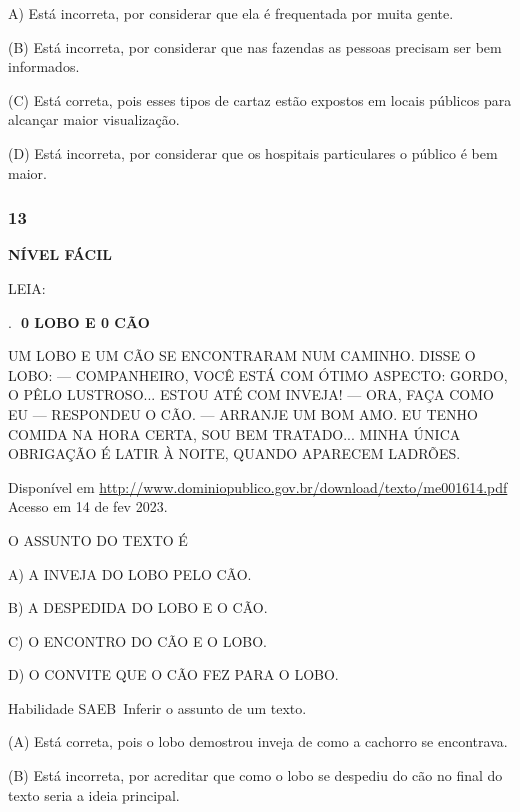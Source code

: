 A) Está incorreta, por considerar que ela é frequentada por muita gente.

(B) Está incorreta, por considerar que nas fazendas as pessoas precisam
ser bem informados.

(C) Está correta, pois esses tipos de cartaz estão expostos em locais
públicos para alcançar maior visualização.

(D) Está incorreta, por considerar que os hospitais particulares o
público é bem maior.

\subsubsection{13}\label{section-123}

\textbf{NÍVEL FÁCIL}

LEIA:

.~\includegraphics{media/image160.png}\includegraphics{media/image160.png}\textbf{0
LOBO E 0 CÃO}

UM LOBO E UM CÃO SE ENCONTRARAM NUM CAMINHO. DISSE O LOBO: ---
COMPANHEIRO, VOCÊ ESTÁ COM ÓTIMO ASPECTO: GORDO, O PÊLO LUSTROSO...
ESTOU ATÉ COM INVEJA! --- ORA, FAÇA COMO EU --- RESPONDEU O CÃO. ---
ARRANJE UM BOM AMO. EU TENHO COMIDA NA HORA CERTA, SOU BEM TRATADO...
MINHA ÚNICA OBRIGAÇÃO É LATIR À NOITE, QUANDO APARECEM LADRÕES.

\protect\hypertarget{_Hlk127335746}{}{}Disponível em
\url{http://www.dominiopublico.gov.br/download/texto/me001614.pdf}
Acesso em 14 de fev 2023.

O ASSUNTO DO TEXTO É

A) A INVEJA DO LOBO PELO CÃO.

B) A DESPEDIDA DO LOBO E O CÃO.

C) O ENCONTRO DO CÃO E O LOBO.

D) O CONVITE QUE O CÃO FEZ PARA O LOBO.

\protect\hypertarget{_Hlk127253071}{}{\protect\hypertarget{_Hlk127335662}{}{}}Habilidade
SAEB~Inferir o assunto de um texto.

(A) Está correta, pois o lobo demostrou inveja de como a cachorro se
encontrava.

(B) Está incorreta, por acreditar que como o lobo se despediu do cão no
final do texto seria a ideia principal.


